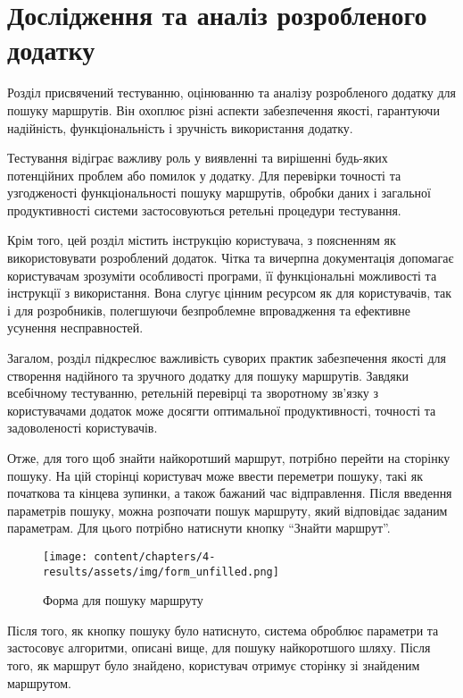 \chapter{Дослідження та аналіз розробленого додатку}
\label{chap:development}

Розділ присвячений тестуванню, оцінюванню та аналізу розробленого додатку для пошуку маршрутів. Він охоплює різні аспекти забезпечення якості, гарантуючи надійність, функціональність і зручність використання додатку.

Тестування відіграє важливу роль у виявленні та вирішенні будь-яких потенційних проблем або помилок у додатку. Для перевірки точності та узгодженості функціональності пошуку маршрутів, обробки даних і загальної продуктивності системи застосовуються ретельні процедури тестування.

Крім того, цей розділ містить інструкцію користувача, з поясненням як використовувати розроблений додаток. Чітка та вичерпна документація допомагає користувачам зрозуміти особливості програми, її функціональні можливості та інструкції з використання. Вона слугує цінним ресурсом як для користувачів, так і для розробників, полегшуючи безпроблемне впровадження та ефективне усунення несправностей.

Загалом, розділ підкреслює важливість суворих практик забезпечення якості для створення надійного та зручного додатку для пошуку маршрутів. Завдяки всебічному тестуванню, ретельній перевірці та зворотному зв'язку з користувачами додаток може досягти оптимальної продуктивності, точності та задоволеності користувачів.


Отже, для того щоб знайти найкоротший маршрут, потрібно перейти на сторінку пошуку. На цій сторінці користувач може ввести переметри пошуку, такі як початкова та кінцева зупинки, а також бажаний час відправлення. Після введення параметрів пошуку, можна розпочати пошук маршруту, який відповідає заданим параметрам. Для цього потрібно натиснути кнопку ``Знайти маршрут''.

\begin{figure}[!htp]
	\centering
	\texttt{[image: content/chapters/4-results/assets/img/form\_unfilled.png]}
	\caption{Форма для пошуку маршруту}
	\label{fig:form-unfilled}
\end{figure}

\newpage

Після того, як кнопку пошуку було натиснуто, система оброблює параметри та застосовує алгоритми, описані вище, для пошуку найкоротшого шляху. Після того, як маршрут було знайдено, користувач отримує сторінку зі знайденим маршрутом.

